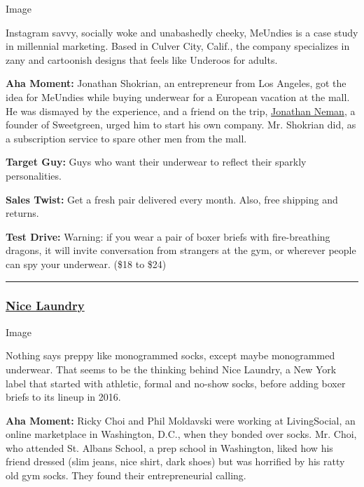Image

Instagram savvy, socially woke and unabashedly cheeky, MeUndies is a
case study in millennial marketing. Based in Culver City, Calif., the
company specializes in zany and cartoonish designs that feels like
Underoos for adults.

\textbf{Aha Moment:} Jonathan Shokrian, an entrepreneur from Los
Angeles, got the idea for MeUndies while buying underwear for a European
vacation at the mall. He was dismayed by the experience, and a friend on
the trip,
\href{https://www.nytimes.com/2018/04/04/fashion/mens-style/sweetgreens-jonathan-neman-on-ditching-his-car-and-phone.html}{Jonathan
Neman}, a founder of Sweetgreen, urged him to start his own company. Mr.
Shokrian did, as a subscription service to spare other men from the
mall.

\textbf{Target Guy:} Guys who want their underwear to reflect their
sparkly personalities.

\textbf{Sales Twist:} Get a fresh pair delivered every month. Also, free
shipping and returns.

\textbf{Test Drive:} Warning: if you wear a pair of boxer briefs with
fire-breathing dragons, it will invite conversation from strangers at
the gym, or wherever people can spy your underwear. (\$18 to \$24)

\begin{center}\rule{0.5\linewidth}{\linethickness}\end{center}

\hypertarget{nice-laundry}{%
\subsubsection{\texorpdfstring{\textbf{\href{https://www.nicelaundry.com/}{Nice
Laundry}}}{Nice Laundry}}\label{nice-laundry}}

Image

Nothing says preppy like monogrammed socks, except maybe monogrammed
underwear. That seems to be the thinking behind Nice Laundry, a New York
label that started with athletic, formal and no-show socks, before
adding boxer briefs to its lineup in 2016.

\textbf{Aha Moment:} Ricky Choi and Phil Moldavski were working at
LivingSocial, an online marketplace in Washington, D.C., when they
bonded over socks. Mr. Choi, who attended St. Albans School, a prep
school in Washington, liked how his friend dressed (slim jeans, nice
shirt, dark shoes) but was horrified by his ratty old gym socks. They
found their entrepreneurial calling.

